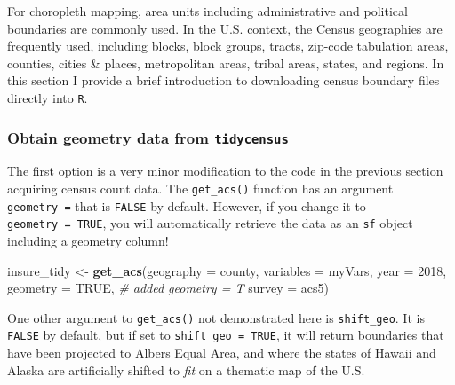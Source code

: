 \documentclass[
]{book}
\newenvironment{Shaded}{\begin{snugshade}}{\end{snugshade}}
\newcommand{\AttributeTok}[1]{\textcolor[rgb]{0.13,0.29,0.53}{#1}}
\newcommand{\CommentTok}[1]{\textcolor[rgb]{0.56,0.35,0.01}{\textit{#1}}}
\newcommand{\ConstantTok}[1]{\textcolor[rgb]{0.56,0.35,0.01}{#1}}
\newcommand{\DecValTok}[1]{\textcolor[rgb]{0.00,0.00,0.81}{#1}}
\newcommand{\FunctionTok}[1]{\textcolor[rgb]{0.13,0.29,0.53}{\textbf{#1}}}
\newcommand{\NormalTok}[1]{#1}
\newcommand{\OtherTok}[1]{\textcolor[rgb]{0.56,0.35,0.01}{#1}}
\newcommand{\StringTok}[1]{\textcolor[rgb]{0.31,0.60,0.02}{#1}}
\newenvironment{rmdtip}[1]
  {
  \begin{itemize}
  \renewcommand{\labelitemi}{
    \raisebox{-.7\height}[0pt][0pt]{
      {\setkeys{Gin}{width=3em,keepaspectratio}\texttt{[image: images/\#1]}}
    }
  }
  \setlength{\fboxsep}{1em}
  \begin{tip}
  \item
  }
  {
  \end{tip}
  \end{itemize}
  }
\begin{document}
For choropleth mapping, area units including administrative and political boundaries are commonly used. In the U.S. context, the Census geographies are frequently used, including blocks, block groups, tracts, zip-code tabulation areas, counties, cities \& places, metropolitan areas, tribal areas, states, and regions. In this section I provide a brief introduction to downloading census boundary files directly into \texttt{R}.

\hypertarget{obtain-geometry-data-from-tidycensus}{%
\subsubsection{\texorpdfstring{Obtain geometry data from \texttt{tidycensus}}{Obtain geometry data from tidycensus}}\label{obtain-geometry-data-from-tidycensus}}

The first option is a very minor modification to the code in the previous section acquiring census count data. The \texttt{get\_acs()} function has an argument \texttt{geometry\ =} that is \texttt{FALSE} by default. However, if you change it to \texttt{geometry\ =\ TRUE}, you will automatically retrieve the data as an \texttt{sf} object including a geometry column!

\begin{Shaded}
\begin{Highlighting}[]
\NormalTok{insure\_tidy }\OtherTok{\textless{}{-}} \FunctionTok{get\_acs}\NormalTok{(}\AttributeTok{geography =} \StringTok{\textquotesingle{}county\textquotesingle{}}\NormalTok{,}
                     \AttributeTok{variables =}\NormalTok{ myVars,}
                     \AttributeTok{year =} \DecValTok{2018}\NormalTok{, }
                     \AttributeTok{geometry =} \ConstantTok{TRUE}\NormalTok{,   }\CommentTok{\# added geometry = T}
                     \AttributeTok{survey =} \StringTok{\textquotesingle{}acs5\textquotesingle{}}\NormalTok{) }
\end{Highlighting}
\end{Shaded}

\begin{rmdtip}{tip}
One other argument to \texttt{get\_acs()} not demonstrated here is \texttt{shift\_geo}. It is \texttt{FALSE} by default, but if set to \texttt{shift\_geo\ =\ TRUE}, it will return boundaries that have been projected to Albers Equal Area, and where the states of Hawaii and Alaska are artificially shifted to \emph{fit} on a thematic map of the U.S.

\end{rmdtip}
\end{document}

